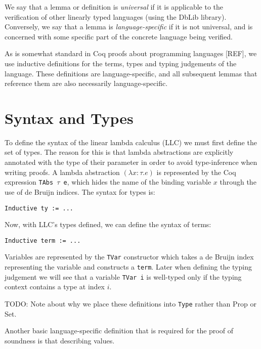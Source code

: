 \documentclass[]{unswthesis}
\begin{document}
We say that a lemma or definition is \textit{universal} if it is applicable to the verification of other linearly typed languages (using the DbLib library). Conversely, we say that a lemma is \textit{language-specific} if it is not universal, and is concerned with some specific part of the concrete language being verified.

As is somewhat standard in Coq proofs about programming languages [REF], we use inductive definitions for the terms, types and typing judgements of the language. These definitions are language-specific, and all subsequent lemmas that reference them are also necessarily language-specific.


\section{Syntax and Types}

To define the syntax of the linear lambda calculus (LLC) we must first define the set of types. The reason for this is that lambda abstractions are explicitly annotated with the type of their parameter in order to avoid type-inference when writing proofs. A lambda abstraction $(\lambda x : \tau. e)$ is represented by the Coq expression \texttt{TAbs $\tau$ e}, which hides the name of the binding variable $x$ through the use of de Bruijn indices. The syntax for types is:

\begin{verbatim}
Inductive ty := ...
\end{verbatim}

Now, with LLC's types defined, we can define the syntax of terms:

\begin{verbatim}
Inductive term := ...
\end{verbatim}

Variables are represented by the \texttt{TVar} constructor which takes a de Bruijn index representing the variable and constructs a \texttt{term}. Later when defining the typing judgement we will see that a variable \texttt{TVar i} is well-typed only if the typing context contains a type at index $i$.

TODO: Note about why we place these definitions into \texttt{Type} rather than Prop or Set.

Another basic language-specific definition that is required for the proof of soundness is that describing values.
\end{document}
